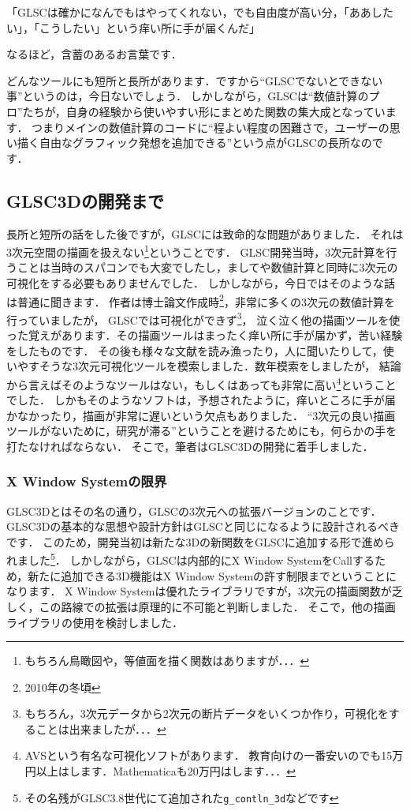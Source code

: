 \documentclass[platex,a4paper,12pt]{jsarticle}%
\begin{document}
\noindent
「GLSCは確かになんでもはやってくれない，でも自由度が高い分，「ああしたい」，「こうしたい」という痒い所に手が届くんだ」

\noindent
なるほど，含蓄のあるお言葉です．

どんなツールにも短所と長所があります．ですから``GLSCでないとできない事''というのは，今日ないでしょう．
しかしながら，GLSCは``数値計算のプロ''たちが，自身の経験から使いやすい形にまとめた関数の集大成となっています．
つまりメインの数値計算のコードに``程よい程度の困難さで，ユーザーの思い描く自由なグラフィック発想を追加できる''という点がGLSCの長所なのです．

\subsection{GLSC3Dの開発まで}
長所と短所の話をした後ですが，GLSCには致命的な問題がありました．
それは3次元空間の描画を扱えない\footnote{もちろん鳥瞰図や，等値面を描く関数はありますが．．．}ということです．
GLSC開発当時，3次元計算を行うことは当時のスパコンでも大変でしたし，ましてや数値計算と同時に3次元の可視化をする必要もありませんでした．
しかしながら，今日ではそのような話は普通に聞きます．
作者は博士論文作成時\footnote{2010年の冬頃}，非常に多くの3次元の数値計算を行っていましたが，
GLSCでは可視化ができず\footnote{もちろん，3次元データから2次元の断片データをいくつか作り，可視化をすることは出来ましたが．．．}，
泣く泣く他の描画ツールを使った覚えがあります．その描画ツールはまったく痒い所に手が届かず，苦い経験をしたものです．
その後も様々な文献を読み漁ったり，人に聞いたりして，使いやすそうな3次元可視化ツールを模索しました．数年模索をしましたが，
結論から言えばそのようなツールはない，もしくはあっても非常に高い\footnote{AVSという有名な可視化ソフトがあります．
教育向けの一番安いのでも15万円以上はします．Mathematicaも20万円はします．．．}ということでした．
しかもそのようなソフトは，予想されたように，痒いところに手が届かなかったり，描画が非常に遅いという欠点もありました．
``3次元の良い描画ツールがないために，研究が滞る''ということを避けるためにも，何らかの手を打たなければならない．
そこで，筆者はGLSC3Dの開発に着手しました．

\subsubsection{X Window Systemの限界}
GLSC3Dとはその名の通り，GLSCの3次元への拡張バージョンのことです．
GLSC3Dの基本的な思想や設計方針はGLSCと同じになるように設計されるべきです．
このため，開発当初は新たな3Dの新関数をGLSCに追加する形で進められました\footnote{その名残がGLSC3.8世代にて追加された\texttt{g\_contln\_3d}などです}．
しかしながら，GLSCは内部的にX Window SystemをCallするため，新たに追加できる3D機能はX Window Systemの許す制限までということになります．
X Window Systemは優れたライブラリですが，3次元の描画関数が乏しく，この路線での拡張は原理的に不可能と判断しました．
そこで，他の描画ライブラリの使用を検討しました．
\end{document}
